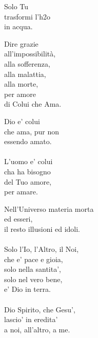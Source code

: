 \begin{haiku}
Solo Tu\\
trasformi l'h2o\\
in acqua.\\
\end{haiku}

\begin{haiku}
    Dire grazie\\
all'impossibilità,\\
alla sofferenza,\\
alla malattia,\\
    alla morte,\\
per amore \\
di Colui che Ama.\\
\end{haiku}

\begin{haiku}
    Dio e' colui\\
che ama, pur non\\
essendo amato.\\
\leavevmode\\
L'uomo e' colui\\
cha ha bisogno\\
del Tuo amore,\\
per amare.\\
\end{haiku}

\begin{haiku}
Nell'Universo materia morta\\
ed esseri,\\
il resto illusioni ed idoli.\\
\leavevmode\\
Solo l'Io, l'Altro, il Noi,\\
che e' pace e gioia,\\
solo nella santita',\\
solo nel vero bene,\\
e' Dio in terra.\\
\leavevmode\\
Dio Spirito, che Gesu',\\
lascio' in eredita'\\
a noi, all'altro, a me.\\
\end{haiku}


